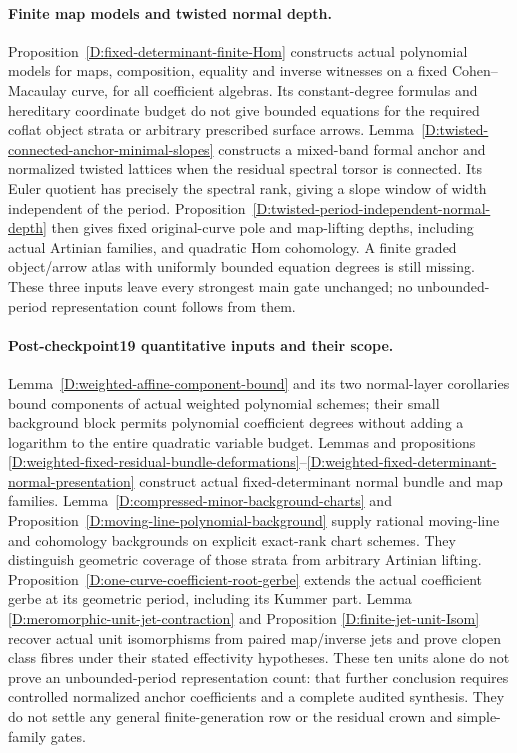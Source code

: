 \paragraph{Finite map models and twisted normal depth.}
Proposition~\ref{D:fixed-determinant-finite-Hom} constructs actual
polynomial models for maps, composition, equality and inverse witnesses
on a fixed Cohen--Macaulay curve, for all coefficient algebras. Its
constant-degree formulas and hereditary coordinate budget do not give
bounded equations for the required coflat object strata or arbitrary
prescribed surface arrows.
Lemma~\ref{D:twisted-connected-anchor-minimal-slopes} constructs a
mixed-band formal anchor and normalized twisted lattices when the
residual spectral torsor is connected. Its Euler quotient has precisely
the spectral rank, giving a slope window of width independent of the
period. Proposition~\ref{D:twisted-period-independent-normal-depth}
then gives fixed original-curve pole and map-lifting depths, including
actual Artinian families, and quadratic Hom cohomology. A finite
graded object/arrow atlas with uniformly bounded equation degrees is
still missing. These three inputs leave every strongest main gate
unchanged; no unbounded-period representation count follows from them.


\paragraph{Post-checkpoint19 quantitative inputs and their scope.}
Lemma~\ref{D:weighted-affine-component-bound} and its two
normal-layer corollaries bound components of actual weighted
polynomial schemes; their small background block permits
polynomial coefficient degrees without adding a logarithm
to the entire quadratic variable budget.
Lemmas and propositions
\ref{D:weighted-fixed-residual-bundle-deformations}--\ref{D:weighted-fixed-determinant-normal-presentation}
construct actual fixed-determinant normal bundle and map
families. Lemma~\ref{D:compressed-minor-background-charts}
and Proposition~\ref{D:moving-line-polynomial-background}
supply rational moving-line and cohomology backgrounds on
explicit exact-rank chart schemes. They distinguish geometric
coverage of those strata from arbitrary Artinian lifting.
Proposition~\ref{D:one-curve-coefficient-root-gerbe}
extends the actual coefficient gerbe at its geometric period,
including its Kummer part. Lemma
\ref{D:meromorphic-unit-jet-contraction} and Proposition
\ref{D:finite-jet-unit-Isom} recover actual unit isomorphisms
from paired map/inverse jets and prove clopen class fibres
under their stated effectivity hypotheses. These ten units
alone do not prove an unbounded-period representation count:
that further conclusion requires controlled normalized anchor
coefficients and a complete audited synthesis. They do not
settle any general finite-generation row or the residual crown
and simple-family gates.


